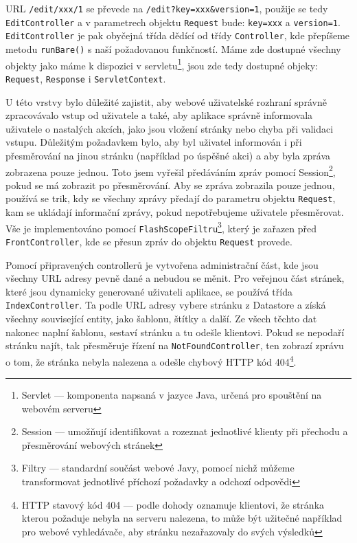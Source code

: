 URL \verb|/edit/xxx/1| se převede na \verb|/edit?key=xxx&version=1|, použije se tedy \verb|EditController| a v parametrech objektu \verb|Request| bude: \verb|key=xxx| a \verb|version=1|. \verb|EditController| je pak obyčejná třída dědící od třídy \verb|Controller|, kde přepíšeme metodu \verb|runBare()| s naší požadovanou funkčností. Máme zde dostupné všechny objekty jako máme k dispozici v servletu\footnote{Servlet --- komponenta napsaná v jazyce Java, určená pro spouštění na webovém serveru}, jsou zde tedy dostupné objeky: \verb|Request|, \verb|Response| i \verb|ServletContext|.

U této vrstvy bylo důležité zajistit, aby webové uživatelské rozhraní správně zpracovávalo vstup od uživatele a také, aby aplikace správně informovala uživatele o nastalých akcích, jako jsou vložení stránky nebo chyba při validaci vstupu. Důležitým požadavkem bylo, aby byl uživatel informován i při přesměrování na jinou stránku (například po úspěšné akci) a aby byla zpráva zobrazena pouze jednou. Toto jsem vyřešil předáváním zpráv pomocí Session\footnote{Session --- umožňují identifikovat a rozeznat jednotlivé klienty při přechodu a přesměrování webových stránek}, pokud se má zobrazit po přesměrování. Aby se zpráva zobrazila pouze jednou, používá se trik, kdy se všechny zprávy předají do parametru objektu \verb|Request|, kam se ukládají informační zprávy, pokud nepotřebujeme uživatele přesměrovat. Vše je implementováno pomocí \verb|FlashScopeFiltru|\footnote{Filtry --- standardní součást webové Javy, pomocí nichž můžeme transformovat jednotlivé příchozí požadavky a odchozí odpovědi}, který je zařazen před \verb|FrontController|, kde se přesun zpráv do objektu \verb|Request| provede.

Pomocí připravených controllerů je vytvořena administrační část, kde jsou všechny URL adresy pevně dané a nebudou se měnit. Pro veřejnou část stránek, které jsou dynamicky generované uživateli aplikace, se používá třída \verb|IndexController|. Ta podle URL adresy vybere stránku z Datastore a získá všechny související entity, jako šablonu, štítky a další. Ze všech těchto dat nakonec naplní šablonu, sestaví stránku a tu odešle klientovi. Pokud se nepodaří stránku najít, tak přesměruje řízení na \verb|NotFoundController|, ten zobrazí zprávu o tom, že stránka nebyla nalezena a odešle chybový HTTP kód 404\footnote{HTTP stavový kód 404 --- podle dohody oznamuje klientovi, že stránka kterou požaduje nebyla na serveru nalezena, to může být užitečné například pro webové vyhledávače, aby stránku nezařazovaly do svých výsledků}.

